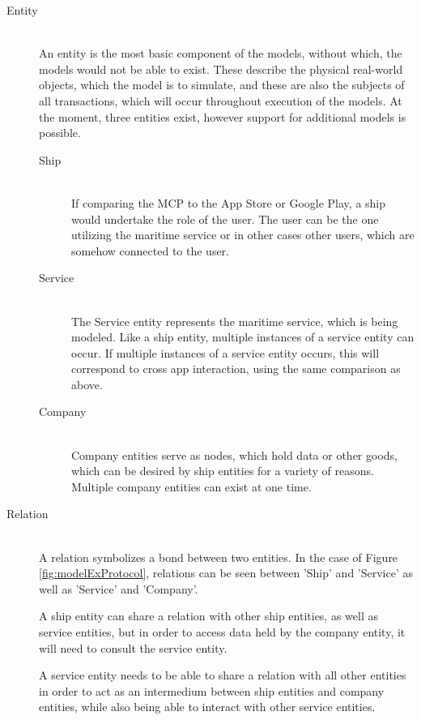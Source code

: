 \begin{description}
	\item[Entity]\ \\
	An entity is the most basic component of the models, without which, the models would not be able to exist. These describe the physical real-world objects, which the model is to simulate, and these are also the subjects of all transactions, which will occur throughout execution of the models. At the moment, three entities exist, however support for additional models is possible.
	\begin{description}
		\item[Ship]\ \\
		If comparing the MCP to the App Store or Google Play, a ship would undertake the role of the user. The user can be the one utilizing the maritime service or in other cases other users, which are somehow connected to the user. 
		\item[Service]\ \\
		The Service entity represents the maritime service, which is being modeled. Like a ship entity, multiple instances of a service entity can occur. If multiple instances of a service entity occurs, this will correspond to cross app interaction, using the same comparison as above.
		\item[Company]\ \\
		Company entities serve as nodes, which hold data or other goods, which can be desired by ship entities for a variety of reasons. Multiple company entities can exist at one time. 
	\end{description}
	\item[Relation]\ \\
	A relation symbolizes a bond between two entities. In the case of Figure \ref{fig:modelExProtocol}, relations can be seen between 'Ship' and 'Service' as well as 'Service' and 'Company'.

	A ship entity can share a relation with other ship entities, as well as service entities, but in order to access data held by the company entity, it will need to consult the service entity.

	A service entity needs to be able to share a relation with all other entities in order to act as an intermedium between ship entities and company entities, while also being able to interact with other service entities.


\end{description}
